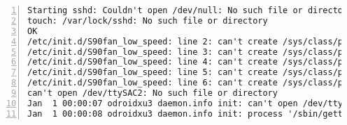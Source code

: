 \begin{lstlisting}[numbers=left]
Starting sshd: Couldn't open /dev/null: No such file or directory
touch: /var/lock/sshd: No such file or directory
OK
/etc/init.d/S90fan_low_speed: line 2: can't create /sys/class/pwm/pwmchip0/export: nonexistent directory
/etc/init.d/S90fan_low_speed: line 3: can't create /sys/class/pwm/pwmchip0/pwm0/period: nonexistent directory
/etc/init.d/S90fan_low_speed: line 4: can't create /sys/class/pwm/pwmchip0/pwm0/duty_cycle: nonexistent directory
/etc/init.d/S90fan_low_speed: line 5: can't create /sys/class/pwm/pwmchip0/pwm0/enable: nonexistent directory
/etc/init.d/S90fan_low_speed: line 6: can't create /sys/class/pwm/pwmchip0/unexport: nonexistent directory
can't open /dev/ttySAC2: No such file or directory
Jan  1 00:00:07 odroidxu3 daemon.info init: can't open /dev/ttySAC2: No such file or directory
Jan  1 00:00:08 odroidxu3 daemon.info init: process '/sbin/getty -L  ttySAC2 115200 vt100 ' (pid 1656) exited. Scheduling for restart.
\end{lstlisting}
